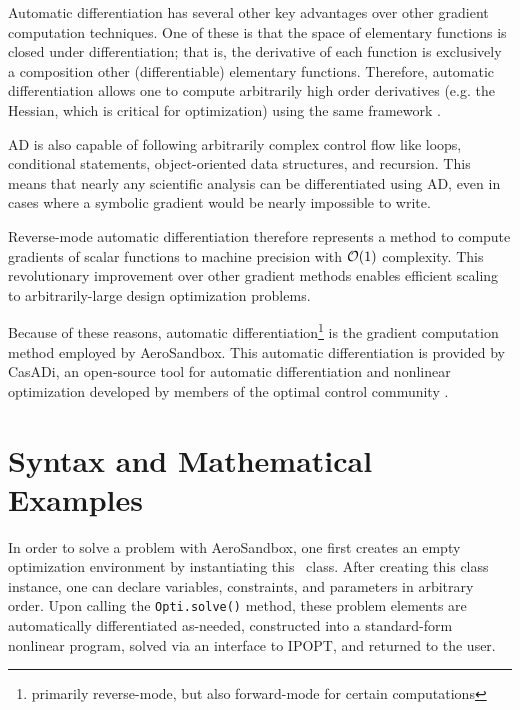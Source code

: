 Automatic differentiation has several other key advantages over other gradient computation techniques. One of these is that the space of elementary functions is closed under differentiation; that is, the derivative of each function is exclusively a composition other (differentiable) elementary functions. Therefore, automatic differentiation allows one to compute arbitrarily high order derivatives (e.g. the Hessian, which is critical for optimization) using the same framework \cite{jax}.

AD is also capable of following arbitrarily complex control flow like loops, conditional statements, object-oriented data structures, and recursion. This means that nearly any scientific analysis can be differentiated using AD, even in cases where a symbolic gradient would be nearly impossible to write.

Reverse-mode automatic differentiation therefore represents a method to compute gradients of scalar functions to machine precision with $\mathcal{O}(1)$ complexity. This revolutionary improvement over other gradient methods enables efficient scaling to arbitrarily-large design optimization problems.

Because of these reasons, automatic differentiation\footnote{primarily reverse-mode, but also forward-mode for certain computations} is the gradient computation method employed by AeroSandbox. This automatic differentiation is provided by CasADi, an open-source tool for automatic differentiation and nonlinear optimization developed by members of the optimal control community \cite{casadi}.

%


\section{Syntax and Mathematical Examples}

In order to solve a problem with AeroSandbox, one first creates an empty optimization environment by instantiating this \opti\ class. After creating this class instance, one can declare variables, constraints, and parameters in arbitrary order. Upon calling the \texttt{Opti.solve()} method, these problem elements are automatically differentiated as-needed, constructed into a standard-form nonlinear program, solved via an interface to IPOPT, and returned to the user.

